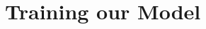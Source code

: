 \documentclass[10pt]{article}
\begin{document}
%
%
% 
%
%    
%
%
%
%





\section{Training our Model}
\end{document}
